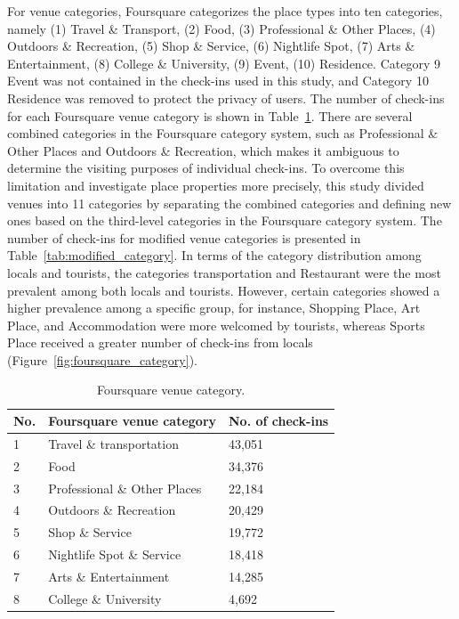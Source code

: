 \documentclass{article}
\theoremstyle{definition}
\theoremstyle{remark}
\begin{document}
For venue categories, Foursquare categorizes the place types into ten categories, namely (1) Travel \& Transport, (2) Food, (3) Professional \& Other Places, (4) Outdoors \& Recreation, (5) Shop \& Service, (6) Nightlife Spot, (7) Arts \& Entertainment, (8) College \& University, (9) Event, (10) Residence. Category 9 Event was not contained in the check-ins used in this study, and Category 10 Residence was removed to protect the privacy of users. The number of check-ins for each Foursquare venue category is shown in Table~\ref{tab:foursquare_category}. There are several combined categories in the Foursquare category system, such as Professional \& Other Places and Outdoors \& Recreation, which makes it ambiguous to determine the visiting purposes of individual check-ins. To overcome this limitation and investigate place properties more precisely, this study divided venues into 11 categories by separating the combined categories and defining new ones based on the third-level categories in the Foursquare category system. The number of check-ins for modified venue categories is presented in Table~\ref{tab:modified_category}. In terms of the category distribution among locals and tourists, the categories transportation and Restaurant were the most prevalent among both locals and tourists. However, certain categories showed a higher prevalence among a specific group, for instance, Shopping Place, Art Place, and Accommodation were more welcomed by tourists, whereas Sports Place received a greater number of check-ins from locals (Figure~\ref{fig:foursquare_category}).

\begin{table}[h!]
\centering
\caption{\label{tab:foursquare_category}Foursquare venue category.}
\begin{tabular}{lll} \hline
No. & Foursquare venue category & No. of check-ins \\ \hline
1 & Travel \& transportation & 43,051 \\
2 & Food & 34,376 \\
3 & Professional \& Other Places & 22,184 \\
4 & Outdoors \& Recreation & 20,429 \\
5 & Shop \& Service & 19,772 \\
6 & Nightlife Spot \& Service & 18,418 \\
7 & Arts \& Entertainment & 14,285 \\
8 & College \& University & 4,692 \\ \hline
\end{tabular}
\end{table}
\end{document}
